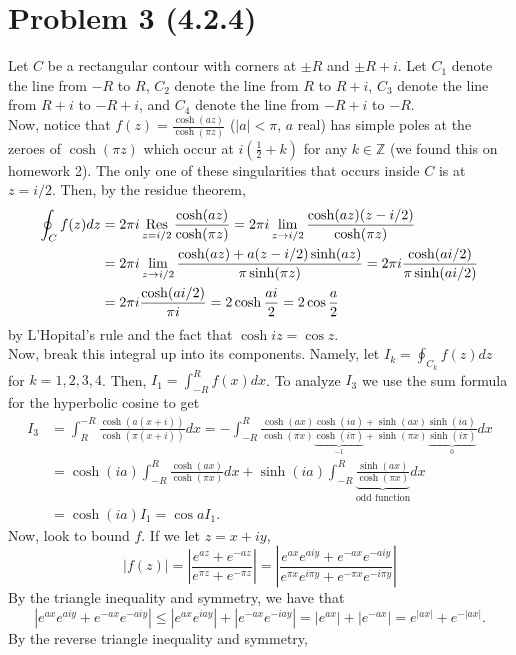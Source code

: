 \documentclass{article}
\begin{document}
\section{Problem 3 (4.2.4)}
Let $C$ be a rectangular contour with corners at $\pm R$ and $\pm R + i$. Let $C_1$ denote the line from $-R$ to $R$, $C_2$ denote the line from $R$ to $R+i$, $C_3$ denote the line from $R+i$ to $-R+i$, and $C_4$ denote the line from $-R+i$ to $-R$. \\Now, notice that $f(z)=\frac{\cosh(az)}{\cosh(\pi z)}$ ($|a|<\pi$, $a$ real) has simple poles at the zeroes of $\cosh(\pi z)$ which occur at $i\left(\frac{1}{2}+k\right)$ for any $k\in\mathbb{Z}$ (we found this on homework 2). The only one of these singularities that occurs inside $C$ is at $z=i/2$. Then, by the residue theorem, 
\begin{align*}
\oint_Cf(z)dz&=2\pi i\operatorname*{Res}_{z=i/2}\frac{\cosh(az)}{\cosh(\pi z)}=2\pi i\lim_{z\to i/2}\frac{\cosh(az)(z-i/2)}{\cosh(\pi z)}\\&=
2\pi i\lim_{z\to i/2}\frac{\cosh(az)+a(z-i/2)\sinh(az)}{\pi\sinh(\pi z)}=2\pi i\frac{\cosh(ai/2)}{\pi\sinh(ai/2)}\\&=
2\pi i\frac{\cosh(ai/2)}{\pi i}=2\cosh\frac{ai}{2}=2\cos\frac{a}{2}
\end{align*}
by L'Hopital's rule and the fact that $\cosh iz = \cos z$.\\
Now, break this integral up into its components. Namely, let $I_k=\oint_{C_k}f(z)dz$ for $k=1,2,3,4$. Then, $I_1=\int_{-R}^Rf(x)dx$. To analyze $I_3$ we use the sum formula for the hyperbolic cosine to get
\begin{align*}
I_3&=\int_R^{-R}\frac{\cosh(a(x+i))}{\cosh(\pi(x+i))}dx=-\int_{-R}^R\frac{\cosh(ax)\cosh(ia)+\sinh(ax)\sinh(ia)}{\cosh(\pi x)\underbrace{\cosh(i\pi)}_{-1}+\sinh(\pi x)\underbrace{\sinh(i\pi)}_0}dx\\&=
\cosh(ia)\int_{-R}^R\frac{\cosh(ax)}{\cosh(\pi x)}dx+\sinh(ia)\int_{-R}^R\underbrace{\frac{\sinh(ax)}{\cosh(\pi x)}}_{\text{odd function}}dx\\&=
\cosh(ia)I_1=\cos aI_1.
\end{align*}
Now, look to bound $f$. If we let $z=x+iy$, 
\[
|f(z)|=\left|\frac{e^{a z}+e^{-a z}}{e^{\pi z}+e^{-\pi z}}\right|=\left|\frac{e^{a x}e^{aiy}+e^{-a x}e^{-aiy}}{e^{\pi x}e^{i\pi y}+e^{-\pi x}e^{-i\pi y}}\right|
\]
By the triangle inequality and symmetry, we have that 
\[
|e^{a x}e^{aiy}+e^{-a x}e^{-aiy}|\leq|e^{a x}e^{ia y}|+|e^{-a x}e^{-ia y}|=|e^{ax}|+|e^{-ax}|=e^{|ax|}+e^{-|ax|}.
\]
By the reverse triangle inequality and symmetry, 
\end{document}
